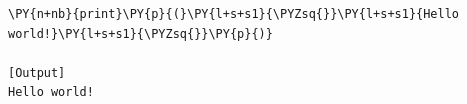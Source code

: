 \begin{Verbatim}[label=\makebox{\url{https://github.com/lucabaldini/cmepda/tree/master/slides/latex/snippets/hello\_world.py}},commandchars=\\\{\}]
\PY{n+nb}{print}\PY{p}{(}\PY{l+s+s1}{\PYZsq{}}\PY{l+s+s1}{Hello world!}\PY{l+s+s1}{\PYZsq{}}\PY{p}{)}

[Output]
Hello world!
\end{Verbatim}